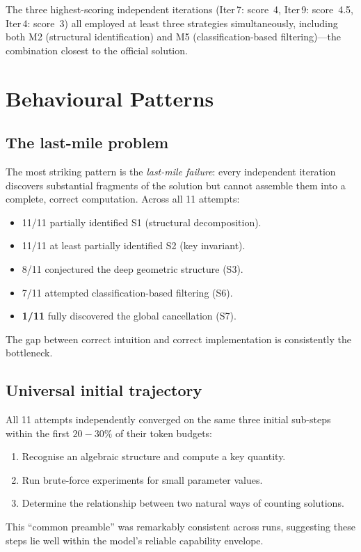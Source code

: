 \documentclass[11pt,a4paper]{article}
\begin{document}
The three highest-scoring independent iterations (Iter\,7:
score~4, Iter\,9: score~4.5, Iter\,4: score~3) all employed at
least three strategies simultaneously, including both M2
(structural identification) and M5 (classification-based
filtering)---the combination closest to the official solution.


\section{Behavioural Patterns}\label{sec:behaviour}

\subsection{The last-mile problem}

\begin{failure}
The most striking pattern is the \emph{last-mile failure}: every
independent iteration discovers substantial fragments of the
solution but cannot assemble them into a complete, correct
computation. Across all 11 attempts:
\begin{itemize}[nosep]
  \item 11/11 partially identified S1 (structural decomposition).
  \item 11/11 at least partially identified S2 (key invariant).
  \item 8/11 conjectured the deep geometric structure (S3).
  \item 7/11 attempted classification-based filtering (S6).
  \item \textbf{1/11} fully discovered the global cancellation (S7).
\end{itemize}
The gap between correct intuition and correct implementation
is consistently the bottleneck.
\end{failure}

\subsection{Universal initial trajectory}

All 11 attempts independently converged on the same three initial
sub-steps within the first $20{-}30\%$ of their token budgets:
\begin{enumerate}[nosep]
  \item Recognise an algebraic structure and compute a key quantity.
  \item Run brute-force experiments for small parameter values.
  \item Determine the relationship between two natural ways of
    counting solutions.
\end{enumerate}
This ``common preamble'' was remarkably consistent across runs,
suggesting these steps lie well within the model's reliable
capability envelope.
\end{document}
